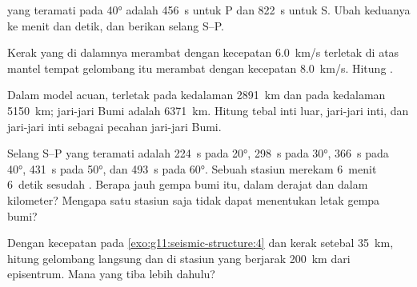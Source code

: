 \begin{exercise}[$\star$]\label{exo:g11:seismic-structure:3}
 yang teramati pada \ang{40} adalah \qty{456}{s} untuk P dan
\qty{822}{s} untuk S. Ubah keduanya ke menit dan detik, dan berikan selang
S--P.
\end{exercise}

\begin{exercise}[$\star$]\label{exo:g11:seismic-structure:4}
Kerak yang di dalamnya  merambat dengan kecepatan \qty{6.0}{km/s}
terletak di atas mantel tempat gelombang itu merambat dengan kecepatan
\qty{8.0}{km/s}. Hitung .
\end{exercise}

\begin{exercise}[$\star$]\label{exo:g11:seismic-structure:5}
Dalam model acuan,  terletak pada kedalaman \qty{2891}{km}
dan  pada kedalaman \qty{5150}{km}; jari-jari Bumi adalah
\qty{6371}{km}. Hitung tebal inti luar, jari-jari inti, dan jari-jari inti
sebagai pecahan jari-jari Bumi.
\end{exercise}

\begin{exercise}[$\star\star$]\label{exo:g11:seismic-structure:6}
Selang S--P yang teramati adalah \qty{224}{s} pada \ang{20}, \qty{298}{s} pada
\ang{30}, \qty{366}{s} pada \ang{40}, \qty{431}{s} pada \ang{50}, dan
\qty{493}{s} pada \ang{60}. Sebuah stasiun merekam  6~menit 6~detik
sesudah . Berapa jauh gempa bumi itu, dalam derajat dan dalam
kilometer? Mengapa satu stasiun saja tidak dapat menentukan letak gempa bumi?
\end{exercise}

\begin{exercise}[$\star\star$]\label{exo:g11:seismic-structure:7}
Dengan kecepatan pada \cref{exo:g11:seismic-structure:4} dan kerak setebal
\qty{35}{km}, hitung  gelombang langsung dan  di
stasiun yang berjarak \qty{200}{km} dari episentrum. Mana yang tiba lebih dahulu?
\end{exercise}

